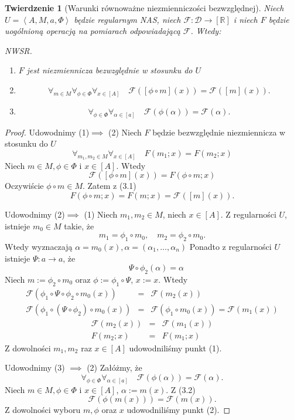 \documentclass[12pt,a4paper]{report}
\newtheorem{tw}[definition]{Twierdzenie}
\newcommand{\domkniecie}[1]{\left\lbrack{#1}\right\rbrack}
\newcommand{\tuple}[1]{\left\langle {#1} \right\rangle}
\begin{document}
\begin{tw}[Warunki równoważne niezmienniczości bezwzględnej]
Niech $U=\tuple{A,M,a,\Phi}$ będzie regularnym NAS, niech $\mathcal{F}:\mathcal{D}\to \domkniecie{\mathbb{R}}$ i niech $F$ będzie uogólnioną operacją na pomiarach odpowiadającą $\mathcal{F}$. Wtedy:

\item
NWSR.
\begin{enumerate}
\item
$F$ jest niezmiennicza bezwzględnie w stosunku do $U$ 
\item
$$
\forall_{m \in M}\forall_{\phi \in \Phi}\forall_{x \in \domkniecie{A}} \quad \mathcal{F}( \domkniecie{\phi \circ m}(x))=\mathcal{F}(\domkniecie{m}(x)).
$$
\item
$$
\forall_{\phi \in \Phi} \forall_{\alpha \in \domkniecie{a}} \quad \mathcal{F}(\phi(\alpha))=\mathcal{F}(\alpha).
$$
\end{enumerate}

\end{tw}
\begin{proof}
Udowodnimy (1)$\implies$ (2)
Niech $F$ będzie bezwzględnie niezmiennicza w stosunku do $U$
\begin{equation}
\forall_{m_{1}, m_{2} \in M}  \forall_{x \in \domkniecie{A}} \quad F(m_{1};x)=F(m_{2};x)
\end{equation}
Niech $m \in M, \phi \in \Phi$ i $x \in \domkniecie{A}$. Wtedy
$$
\mathcal{F}(\domkniecie{\phi \circ m}(x))=F(\phi \circ m;x)
$$
Oczywiście $\phi \circ m \in M$. Zatem z (3.1)
$$
F(\phi \circ m; x)=F(m;x)=\mathcal{F}(\domkniecie{m}(x)).
$$

Udowodnimy (2)$\implies$ (1)
Niech $m_1,m_2 \in M$, niech $x\in\domkniecie{A}$.
Z regularności $U$, istnieje $m_0\in M$ takie, że
$$
m_1=\phi_1\circ m_0, \quad m_2=\phi_2\circ m_0.
$$
Wtedy wyznaczają $\alpha=m_0(x), \alpha=(\alpha_1,\dots,\alpha_n)$ 
Ponadto z regularności $U$ istnieje $\Psi:a\to a$, że
$$
\quad \Psi\circ \phi_2(\alpha)=\alpha
$$
Niech $m:=\phi_2\circ m_0$ oraz $\phi:=\phi_1\circ\Psi$, $x:=x$. Wtedy
\begin{eqnarray*}
\mathcal{F}(\phi_1\circ \Psi\circ \phi_2 \circ m_0(x)) & = & \mathcal{F}(m_2(x)) \\
\mathcal{F}(\phi_1\circ(\Psi\circ \phi_2)\circ m_0(x)) & = & \mathcal{F}(\phi_1\circ m_0(x)) = \mathcal{F}(m_1(x))
\end{eqnarray*}
\begin{eqnarray*}
\mathcal{F}(m_2(x)) & = & \mathcal{F}(m_1(x))\\
F(m_2;x) & = & F(m_1;x)
\end{eqnarray*}
Z dowolności $m_1,m_2$ raz $x\in \domkniecie{A}$ udowodniliśmy punkt (1).

Udowodnimy (3) $\implies$ (2)
Załóżmy, że
\begin{equation}
\forall_{\phi \in \Phi} \forall_{\alpha \in \domkniecie{a}} \quad \mathcal{F}(\phi(\alpha))=\mathcal{F}(\alpha).
\end{equation}
Niech $m\in M, \phi \in \Phi$ i $x\in\domkniecie{A}$, $\alpha:=m(x)$. Z (3.2)
$$
 \mathcal{F}(\phi(m(x)))=\mathcal{F}(m(x)).
$$
Z dowolności wyboru $m, \phi$ oraz $x$ udowodniliśmy punkt (2).
\end{proof}
\end{document}
